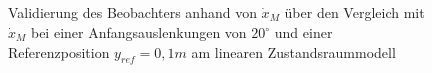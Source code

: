 \begin{figure}[H]
    \centering
    \caption[Vergleich $\dot{x}_M$, $\hat{\dot{x}}_M$]{Validierung des Beobachters anhand von $\dot{x}_M$ über den Vergleich mit $\hat{\dot{x}}_M$ bei einer Anfangsauslenkungen von $20^\circ$ und einer Referenzposition $y_{ref} = 0,1 m$ am linearen Zustandsraummodell}
    \label{fig:Bild52}
\end{figure}


